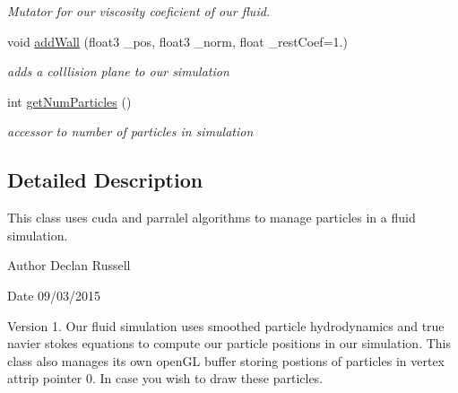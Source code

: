 \begin{DoxyCompactItemize}
\begin{DoxyCompactList}\small\item\em Mutator for our viscosity coeficient of our fluid. \end{DoxyCompactList}\item 
void \hyperlink{class_s_p_h_engine_aa53becc41023eb45601eb3060860193a}{add\-Wall} (float3 \-\_\-pos, float3 \-\_\-norm, float \-\_\-rest\-Coef=1.)
\begin{DoxyCompactList}\small\item\em adds a colllision plane to our simulation \end{DoxyCompactList}\item 
\hypertarget{class_s_p_h_engine_a387ab48532ca20b2eb31319e862e243b}{int \hyperlink{class_s_p_h_engine_a387ab48532ca20b2eb31319e862e243b}{get\-Num\-Particles} ()}\label{class_s_p_h_engine_a387ab48532ca20b2eb31319e862e243b}

\begin{DoxyCompactList}\small\item\em accessor to number of particles in simulation \end{DoxyCompactList}\end{DoxyCompactItemize}


\subsection{Detailed Description}
This class uses cuda and parralel algorithms to manage particles in a fluid simulation. 

\begin{DoxyAuthor}{Author}
Declan Russell 
\end{DoxyAuthor}
\begin{DoxyDate}{Date}
09/03/2015 
\end{DoxyDate}
\begin{DoxyVersion}{Version}
1. Our fluid simulation uses smoothed particle hydrodynamics and true navier stokes equations to compute our particle positions in our simulation. This class also manages its own open\-G\-L buffer storing postions of particles in vertex attrip pointer 0. In case you wish to draw these particles. 
\end{DoxyVersion}


